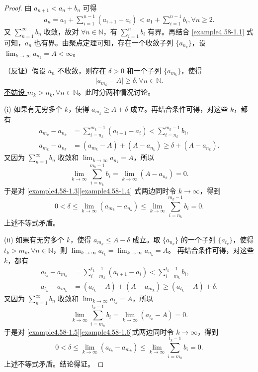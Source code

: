 \documentclass[../../main.tex]{subfiles}%
\begin{document}
\begin{proof}

由 \(a_{n + 1} < a_n + b_n\) 可得
\begin{align}
a_n = a_1 + \sum_{i = 1}^{n - 1} (a_{i + 1} - a_i) < a_1 + \sum_{i = 1}^{n - 1} b_i, \forall n \geqslant 2. \label{example4.58-1.1}
\end{align}
又 \(\sum_{n = 1}^{\infty} b_n\) 收敛，故对 \(\forall n \in \mathbb{N}\)，有 \(\sum_{i = 1}^n b_i\) 有界。再结合 \eqref{example4.58-1.1} 式可知，\(a_n\) 也有界。由聚点定理可知，存在一个收敛子列 \(\{ a_{n_k} \}\)，设 \(\lim_{k \to \infty} a_{n_k} = A < \infty\)。

（反证）假设 \(a_n\) 不收敛，则存在 \(\delta > 0\) 和一个子列 \(\{ a_{m_k} \}\)，使得
\begin{align*}
\vert a_{m_k} - A \vert \geqslant \delta, \forall n \in \mathbb{N}. 
\end{align*}
\hyperlink{example4.58不妨设的原因}{不妨设 \(m_k > n_k, \forall n \in \mathbb{N}\)}。此时分两种情况讨论。

(i) 如果有无穷多个 \(k\)，使得 \(a_{m_k} \geqslant A + \delta\) 成立。再结合条件可得，对这些 \(k\)，都有
\begin{align}
a_{m_k} - a_{n_k} &= \sum_{i = n_k}^{m_k - 1} (a_{i + 1} - a_i) < \sum_{i = n_k}^{m_k - 1} b_i, \label{example4.58-1.3}\\
a_{m_k} - a_{n_k} &= (a_{m_k} - A) + (A - a_{n_k}) \geqslant \delta + (A - a_{n_k}). \label{example4.58-1.4}
\end{align}
又因为 \(\sum_{n = 1}^{\infty} b_n\) 收敛和 \(\lim_{k \to \infty} a_{n_k} = A\)，所以
\[
\lim_{k \to \infty} \sum_{i = n_k}^{m_k - 1} b_i = \lim_{k \to \infty} (A - a_{n_k}) = 0.
\]
于是对 \eqref{example4.58-1.3}\eqref{example4.58-1.4} 式两边同时令 \(k \to \infty\)，得到
\[
0 < \delta \leqslant \lim_{k \to \infty} (a_{m_k} - a_{n_k}) \leqslant \lim_{k \to \infty} \sum_{i = n_k}^{m_k - 1} b_i = 0.
\]
上述不等式矛盾。

(ii) 如果有无穷多个 \(k\)，使得 \(a_{m_k} \leqslant A - \delta\) 成立。取 \(\{ a_{n_k} \}\) 的一个子列 \(\{ a_{t_k} \}\)，使得 \(t_k > m_k, \forall n \in \mathbb{N}\)，则 \(\lim_{k \to \infty} a_{t_k} = \lim_{k \to \infty} a_{n_k} = A\)。
再结合条件可得，对这些 \(k\)，都有
\begin{align}
a_{t_k} - a_{m_k} &= \sum_{i = m_k}^{t_k - 1} (a_{i + 1} - a_i) < \sum_{i = m_k}^{t_k - 1} b_i, \label{example4.58-1.5}\\
a_{t_k} - a_{m_k} &= (a_{t_k} - A) + (A - a_{m_k}) \geqslant (a_{t_k} - A) + \delta. \label{example4.58-1.6}
\end{align}
又因为 \(\sum_{n = 1}^{\infty} b_n\) 收敛和 \(\lim_{k \to \infty} a_{t_k} = A\)，所以
\[
\lim_{k \to \infty} \sum_{i = m_k}^{t_k - 1} b_i = \lim_{k \to \infty} (a_{t_k} - A) = 0.
\]
于是对 \eqref{example4.58-1.5}\eqref{example4.58-1.6}式两边同时令 \(k \to \infty\)，得到
\[
0 < \delta \leqslant \lim_{k \to \infty} (a_{t_k} - a_{m_k}) \leqslant \lim_{k \to \infty} \sum_{i = m_k}^{t_k - 1} b_i = 0.
\]
上述不等式矛盾。结论得证。

\end{proof}
\end{document}

